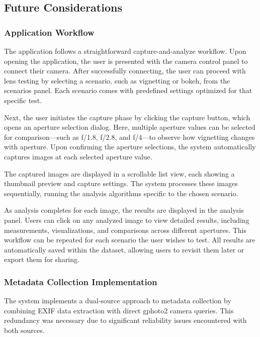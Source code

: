 \subsection{Future Considerations}

\subsubsection{Application Workflow}

The application follows a straightforward capture-and-analyze workflow. Upon opening the application, the user is presented with the camera control panel to connect their camera. After successfully connecting, the user can proceed with lens testing by selecting a scenario, such as vignetting or bokeh, from the scenarios panel. Each scenario comes with predefined settings optimized for that specific test.

Next, the user initiates the capture phase by clicking the capture button, which opens an aperture selection dialog. Here, multiple aperture values can be selected for comparison—such as f/1.8, f/2.8, and f/4—to observe how vignetting changes with aperture. Upon confirming the aperture selections, the system automatically captures images at each selected aperture value.

The captured images are displayed in a scrollable list view, each showing a thumbnail preview and capture settings. The system processes these images sequentially, running the analysis algorithms specific to the chosen scenario.

As analysis completes for each image, the results are displayed in the analysis panel. Users can click on any analyzed image to view detailed results, including measurements, visualizations, and comparisons across different apertures. This workflow can be repeated for each scenario the user wishes to test. All results are automatically saved within the dataset, allowing users to revisit them later or export them for sharing.

\subsubsection{Metadata Collection Implementation}

The system implements a dual-source approach to metadata collection by combining EXIF data extraction with direct gphoto2 camera queries. This redundancy was necessary due to significant reliability issues encountered with both sources.

